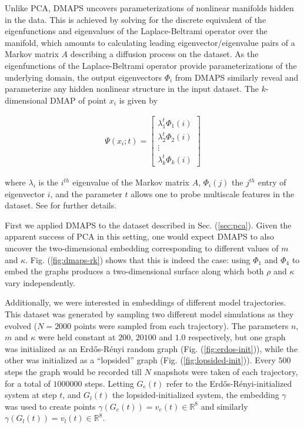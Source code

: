   Unlike PCA, DMAPS uncovers parameterizations of nonlinear manifolds
  hidden in the data.
  This is achieved by solving for the discrete equivalent of the
  eigenfunctions and eigenvalues of the Laplace-Beltrami operator over
  the manifold, which amounts to calculating leading
  eigenvector/eigenvalue pairs of a Markov matrix $A$ describing a
  diffusion process on the dataset.
  As the eigenfunctions of the Laplace-Beltrami operator provide
  parameterizations of the underlying domain, the output eigenvectors
  $\Phi_i$ from DMAPS similarly reveal and parameterize any hidden
  nonlinear structure in the input dataset. The $k$-dimensional DMAP
  of point $x_i$ is given by

  \begin{align*}
    \Psi(x_i; t) = \begin{bmatrix} \lambda_1^t \Phi_1(i) \\ \lambda_2^t
      \Phi_2(i) \\ \vdots \\
      \lambda_k^t \Phi_k(i) \end{bmatrix}
  \end{align*}

  \noindent where $\lambda_i$ is the $i^{th}$ eigenvalue of the Markov
  matrix $A$, $\Phi_i(j)$ the $j^{th}$ entry of eigenvector $i$, and
  the parameter $t$ allows one to probe multiscale features in the
  dataset. See \cite{coifman_diffusion_2006,nadler_diffusion_2006} for
  further details.

  First we applied DMAPS to the dataset described in
  Sec. (\ref{sec:pca}).
  Given the apparent success of PCA in this setting, one would expect
  DMAPS to also uncover the two-dimensional embedding corresponding to
  different values of $m$ and $\kappa$.
  Fig. (\ref{fig:dmaps-rk}) shows that this is indeed the case: using
  $\Phi_1$ and $\Phi_4$ to embed the graphs produces a two-dimensional
  surface along which both $\rho$ and $\kappa$ vary independently.

  Additionally, we were interested in embeddings of different model
  trajectories.
  This dataset was generated by sampling two different model
  simulations as they evolved ($N=2000$ points were sampled from each
  trajectory).
  The parameters $n$, $m$ and $\kappa$ were held constant at $200$,
  $20100$ and $1.0$ respectively, but one graph was initialized as an
  Erd\H{o}s-R\'{e}nyi random graph (Fig. (\ref{fig:erdos-init})),
  while the other was initialized as a ``lopsided'' graph
  (Fig. (\ref{fig:lopsided-init})).
  Every $500$ steps the graph would be recorded till $N$ snapshots
  were taken of each trajectory, for a total of $1000000$ steps.
  Letting $G_e(t)$ refer to the Erd\H{o}s-R\'{e}nyi-initialized system
  at step $t$, and $G_l(t)$ the lopsided-initialized system, the
  embedding $\gamma$ was used to create points
  $\gamma(G_e(t)) = v_e(t) \in \mathbb{R}^8$ and
  similarly $\gamma(G_l(t)) = v_l(t) \in \mathbb{R}^8$.

